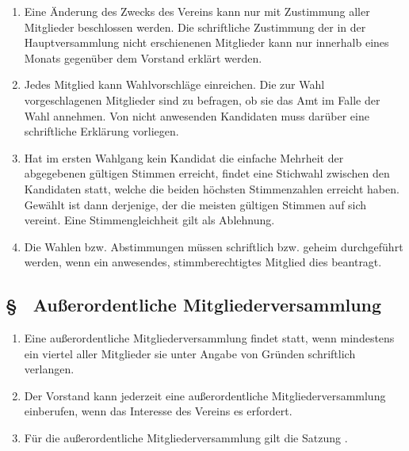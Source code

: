 \begin{enumerate}
    \item \label{sa:abs:ta1pq4} Eine Änderung des Zwecks des Vereins kann nur mit Zustimmung aller Mitglieder beschlossen werden. Die schriftliche Zustimmung der in der Hauptversammlung nicht erschienenen Mitglieder kann nur innerhalb eines Monats gegenüber dem Vorstand erklärt werden.

    \item \label{sa:abs:11zh5p} Jedes Mitglied kann Wahlvorschläge einreichen. Die zur Wahl vorgeschlagenen Mitglieder sind zu befragen, ob sie das Amt im Falle der Wahl annehmen. Von nicht anwesenden Kandidaten muss darüber eine schriftliche Erklärung vorliegen.

    \item \label{sa:abs:6flf65} Hat im ersten Wahlgang kein Kandidat die einfache Mehrheit der abgegebenen gültigen Stimmen erreicht, findet eine Stichwahl zwischen den Kandidaten statt, welche die beiden höchsten Stimmenzahlen erreicht haben. Gewählt ist dann derjenige, der die meisten gültigen Stimmen auf sich vereint. Eine Stimmengleichheit gilt als Ablehnung.

    \item \label{sa:abs:8hj0l5} Die Wahlen bzw. Abstimmungen müssen schriftlich bzw. geheim durchgeführt werden, wenn ein anwesendes, stimmberechtigtes Mitglied dies beantragt.
\end{enumerate}

\subsection{§ \thesaparagraphcounter\ Außerordentliche Mitgliederversammlung} \label{sa:par:ausserordentliche_mitgliederversammlung}
\begin{enumerate}
    \item \label{sa:abs:e1huxs} Eine außerordentliche Mitgliederversammlung findet statt, wenn mindestens ein viertel aller Mitglieder sie unter Angabe von Gründen schriftlich verlangen.

    \item \label{sa:abs:llgbik} Der Vorstand kann jederzeit eine außerordentliche Mitgliederversammlung einberufen, wenn das Interesse des Vereins es erfordert.

    \item \label{sa:abs:m4rvbb} Für die außerordentliche Mitgliederversammlung gilt die Satzung .
\end{enumerate}

